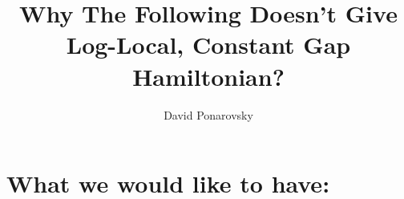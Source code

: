 \documentclass[manuscript,screen,review]{acmart}
\begin{document}


\title{Why The Following Doesn't Give Log-Local, Constant Gap Hamiltonian?} 
\author{David Ponarovsky}

\ifdefined\ACM
\else
  \maketitle
\fi
%
\ifdefined\ACM
  \maketitle
\fi


%
%

\section{What we would like to have:}
\end{document}
